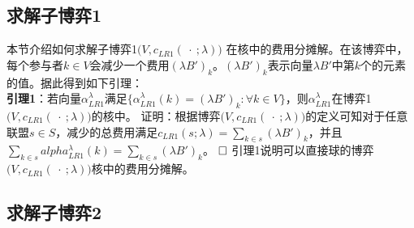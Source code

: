 \documentclass[UTF8]{article}
\begin{document}
    \subsection{求解子博弈1}
    本节介绍如何求解子博弈1$\big(V,c_{LR1}(\ \cdot\ ;\lambda)\big)$ 在核中的费用分摊解。在该博弈中，每个参与者$k \in V $会减少一个费用$(\lambda B')_k$。$(\lambda B')_k$表示向量$\lambda B'$中第$k$个的元素的值。据此得到如下引理：\\
\textbf{引理1}：若向量$\alpha_{LR1}^{\lambda}$满足$\{\alpha_{LR1}^{\lambda}(k) = (\lambda B')_k:\forall k \in V \}$，则$\alpha_{LR1}^{\lambda}$在博弈1$\big(V,c_{LR1}(\ \cdot\ ;\lambda)\big)$的核中。
证明：根据博弈$\big(V,c_{LR1}(\ \cdot\ ;\lambda)\big)$的定义可知对于任意联盟$s \in S$，减少的总费用满足$c_{LR1}(s;\lambda) = \sum_{k \in s} (\lambda B')_k$，并且$ \sum_{k \in s} alpha_{LR1}^{\lambda}(k) = \sum_{k \in s} (\lambda B')_k$。
$\hfill\square$
引理1说明可以直接球的博弈$\big(V,c_{LR1}(\ \cdot\ ;\lambda)\big)$核中的费用分摊解。


    \subsection{求解子博弈2}
\end{document}
